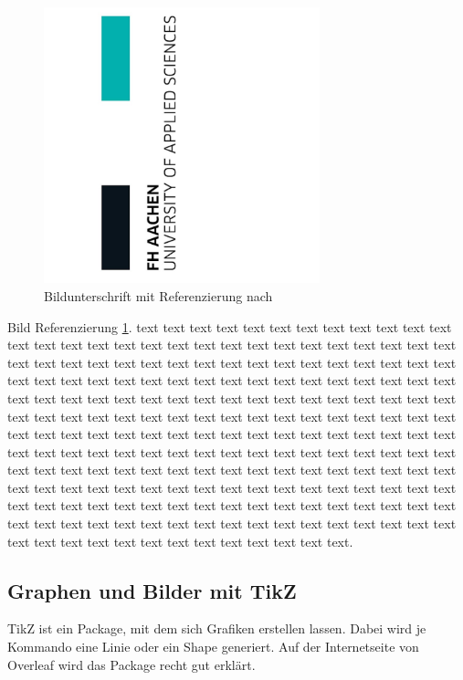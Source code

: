 \begin{figure}
  \includegraphics[width=8cm]{pic/fhac_2.jpg}
  \caption{Bildunterschrift mit Referenzierung nach \cite{article}}
  \label{fig:bild}
\end{figure}

Bild Referenzierung \ref{fig:bild}.  text text text text text text text text text text text text text text text text text text text text text text text text text text text text text text text text text text text text text text text text text text text text text text text text text text text text text text text text text text text text text text text text text text text text text text text text text text text text text text text text text text text text text text text text text text text text text text text text text text text text text text text text text text text text text text text text text text text text text text text text text text text text text text text text text text text text text text text text text text text text text text text text text text text text text text text text text text text text text text text text text text text text text text text text text text text text text text text text text text text text text text text text text text text text text text text text text text text text text text text text text text text text text text text text text text text text.

\newpage

\subsection{Graphen und Bilder mit TikZ}


TikZ ist ein Package, mit dem sich Grafiken erstellen lassen. Dabei wird je Kommando eine Linie oder ein Shape generiert.  Auf der Internetseite von Overleaf \cite{tikz} wird das Package recht gut erklärt.


